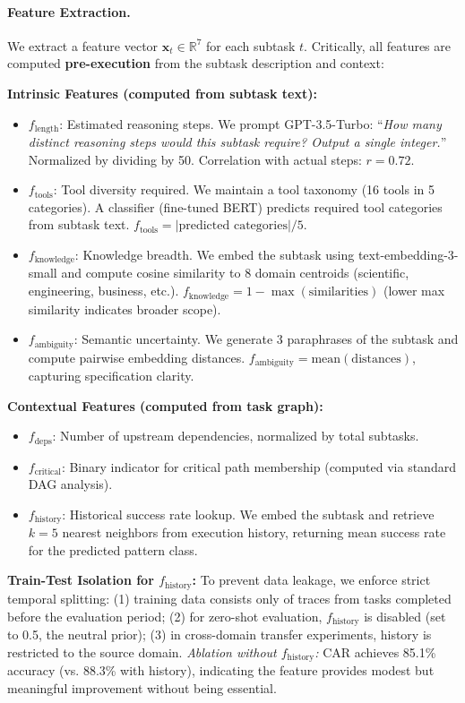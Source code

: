 \documentclass{article}
\theoremstyle{plain}
\theoremstyle{definition}
\theoremstyle{remark}
\begin{document}
\paragraph{Feature Extraction.}
We extract a feature vector $\mathbf{x}_t \in \mathbb{R}^7$ for each subtask $t$. Critically, all features are computed \textbf{pre-execution} from the subtask description and context:

\textbf{Intrinsic Features (computed from subtask text):}
\begin{itemize}[nosep,leftmargin=*]
	\item $f_{\text{length}}$: Estimated reasoning steps. We prompt GPT-3.5-Turbo: ``\textit{How many distinct reasoning steps would this subtask require? Output a single integer.}'' Normalized by dividing by 50. Correlation with actual steps: $r=0.72$.
	\item $f_{\text{tools}}$: Tool diversity required. We maintain a tool taxonomy (16 tools in 5 categories). A classifier (fine-tuned BERT) predicts required tool categories from subtask text. $f_{\text{tools}} = |\text{predicted categories}| / 5$.
	\item $f_{\text{knowledge}}$: Knowledge breadth. We embed the subtask using text-embedding-3-small and compute cosine similarity to 8 domain centroids (scientific, engineering, business, etc.). $f_{\text{knowledge}} = 1 - \max(\text{similarities})$ (lower max similarity indicates broader scope).
	\item $f_{\text{ambiguity}}$: Semantic uncertainty. We generate 3 paraphrases of the subtask and compute pairwise embedding distances. $f_{\text{ambiguity}} = \text{mean}(\text{distances})$, capturing specification clarity.
\end{itemize}

\textbf{Contextual Features (computed from task graph):}
\begin{itemize}[nosep,leftmargin=*]
	\item $f_{\text{deps}}$: Number of upstream dependencies, normalized by total subtasks.
	\item $f_{\text{critical}}$: Binary indicator for critical path membership (computed via standard DAG analysis).
	\item $f_{\text{history}}$: Historical success rate lookup. We embed the subtask and retrieve $k=5$ nearest neighbors from execution history, returning mean success rate for the predicted pattern class.
\end{itemize}

\textbf{Train-Test Isolation for $f_{\text{history}}$:} To prevent data leakage, we enforce strict temporal splitting: (1) training data consists only of traces from tasks completed before the evaluation period; (2) for zero-shot evaluation, $f_{\text{history}}$ is disabled (set to 0.5, the neutral prior); (3) in cross-domain transfer experiments, history is restricted to the source domain. \textit{Ablation without $f_{\text{history}}$:} CAR achieves 85.1\% accuracy (vs. 88.3\% with history), indicating the feature provides modest but meaningful improvement without being essential.
\end{document}
